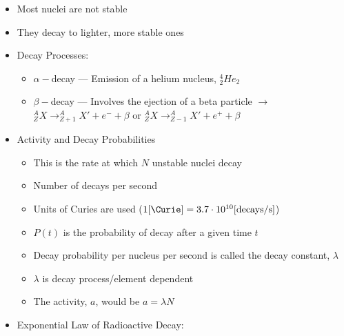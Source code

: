 \begin{itemize}
    \begin{itemize}

      \item Most nuclei are not stable

      \item They decay to lighter, more stable ones

      \item Decay Processes:

        \begin{itemize}

          \item $\alpha-$decay — Emission of a helium nucleus, $^4_2He_2$

          \item $\beta-$decay — Involves the ejection of a beta particle $\rightarrow$ $^A_ZX\rightarrow ^A_{Z+1}X' + e^- + \beta$ or $^A_ZX\rightarrow ^A_{Z-1}X' + e^+ + \beta$

        \end{itemize}

      \item Activity and Decay Probabilities

        \begin{itemize}

          \item This is the rate at which $N$ unstable nuclei decay

          \item Number of decays per second

          \item Units of Curies are used ($1[\si{\Curie}]=3.7\cdot10^{10}[\text{decays}/\si{\second}]$)

          \item $P(t)$ is the probability of decay after a given time $t$

          \item Decay probability per nucleus per second is called the decay constant, $\lambda$

          \item $\lambda$ is decay process/element dependent

          \item The activity, $a$, would be $a=\lambda N$

        \end{itemize}

      \item Exponential Law of Radioactive Decay:


\end{itemize}
\end{itemize}
